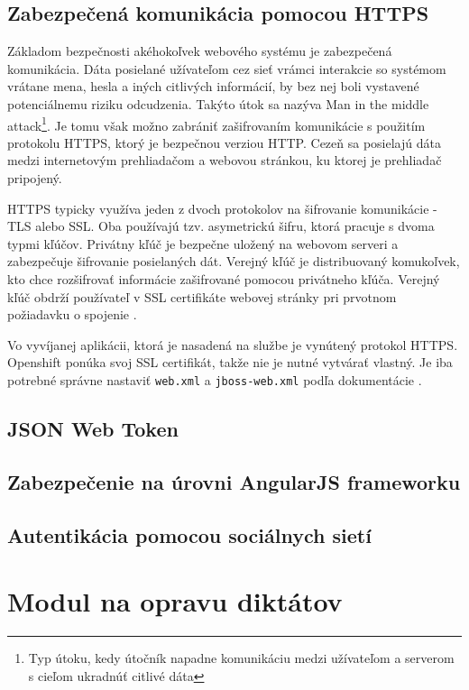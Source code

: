 \documentclass[12pt,oneside]{fithesis2}
\begin{document}
      		\subsection{Zabezpečená komunikácia pomocou HTTPS}
      		\par Základom bezpečnosti akéhokoľvek webového systému je zabezpečená komunikácia. Dáta posielané užívateľom cez sieť vrámci interakcie so systémom vrátane mena, hesla a iných citlivých informácií, by bez nej boli vystavené potenciálnemu riziku odcudzenia. Takýto útok sa nazýva Man in the middle attack\footnote{Typ útoku, kedy útočník napadne komunikáciu medzi užívateľom a serverom s cieľom ukradnúť citlivé dáta}. Je tomu však možno zabrániť zašifrovaním komunikácie s použitím protokolu HTTPS, ktorý je bezpečnou verziou HTTP. Cezeň sa posielajú dáta medzi internetovým prehliadačom a webovou stránkou, ku ktorej je prehliadač pripojený. 
      		\par HTTPS typicky využíva jeden z dvoch protokolov na šifrovanie komunikácie - TLS alebo SSL. Oba používajú tzv. asymetrickú šifru, ktorá pracuje s dvoma typmi kľúčov. Privátny kľúč je bezpečne uložený na webovom serveri a zabezpečuje šifrovanie posielaných dát. Verejný kľúč je distribuovaný komukoľvek, kto chce rozšifrovať informácie zašifrované pomocou privátneho kľúča. Verejný kľúč obdrží používateľ v SSL certifikáte webovej stránky pri prvotnom požiadavku o spojenie \cite{comodo15}.
      		\par Vo vyvíjanej aplikácii, ktorá je nasadená na službe je vynútený protokol HTTPS. Openshift ponúka svoj SSL certifikát, takže nie je nutné vytvárať vlastný. Je iba potrebné správne nastaviť \texttt{web.xml} a \texttt{jboss-web.xml} podľa dokumentácie \cite{openshift15}.
      		\pagebreak

      		\subsection{JSON Web Token}
      		\subsection{Zabezpečenie na úrovni AngularJS frameworku}
      		\subsection{Autentikácia pomocou sociálnych sietí}
      \section{Modul na opravu diktátov}
      
\end{document}
